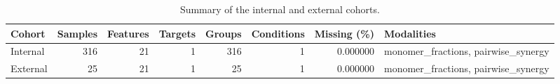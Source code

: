 \begin{table}
\caption{Summary of the internal and external cohorts.}
\label{tab:dataset_summary}
\begin{tabular}{lrrrrrrl}
\toprule
Cohort & Samples & Features & Targets & Groups & Conditions & Missing (\%) & Modalities \\
\midrule
Internal & 316 & 21 & 1 & 316 & 1 & 0.000000 & monomer\_fractions, pairwise\_synergy \\
External & 25 & 21 & 1 & 25 & 1 & 0.000000 & monomer\_fractions, pairwise\_synergy \\
\bottomrule
\end{tabular}
\end{table}
